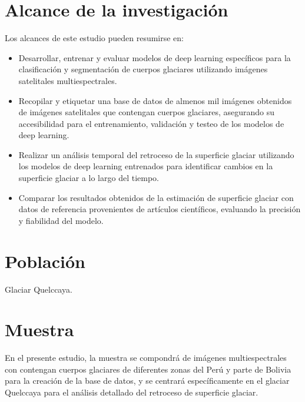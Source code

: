 \section{Alcance de la investigación}
Los alcances de este estudio pueden resumirse en:
	\begin{itemize}
		\item Desarrollar, entrenar y evaluar modelos de deep learning específicos para la clasificación y segmentación de cuerpos glaciares utilizando imágenes satelitales multiespectrales.
		\item Recopilar y etiquetar una base de datos de almenos mil imágenes obtenidos de imágenes satelitales que contengan cuerpos glaciares, asegurando su accesibilidad para el entrenamiento, validación y testeo de los modelos de deep learning.
		\item Realizar un análisis temporal del retroceso de la superficie glaciar utilizando los modelos de deep learning entrenados para identificar cambios en la superficie glaciar a lo largo del tiempo.
		\item Comparar los resultados obtenidos de la estimación de superficie glaciar con datos de referencia provenientes de artículos científicos, evaluando la precisión y fiabilidad del modelo.
	
	\end{itemize}
\section{Población}
Glaciar Quelccaya.
 
\section{Muestra}
En el presente estudio, la muestra se compondrá de imágenes multiespectrales con contengan cuerpos glaciares de diferentes zonas del Perú y parte de Bolivia para la creación de la base de datos, y se centrará específicamente en el glaciar Quelccaya para el análisis detallado del retroceso de superficie glaciar.
